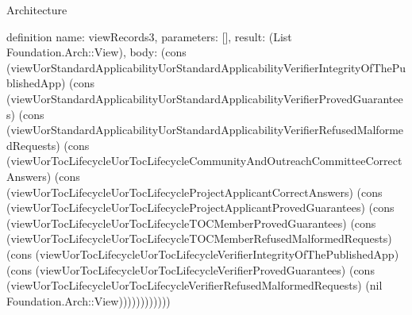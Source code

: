 \begin{lexlean}{Architecture}
\begin{semanticmodule}
definition{
  name: viewRecords3,
  parameters: [],
  result: (List Foundation.Arch::View),
  body: (cons (viewUorStandardApplicabilityUorStandardApplicabilityVerifierIntegrityOfThePublishedApp) (cons (viewUorStandardApplicabilityUorStandardApplicabilityVerifierProvedGuarantees) (cons (viewUorStandardApplicabilityUorStandardApplicabilityVerifierRefusedMalformedRequests) (cons (viewUorTocLifecycleUorTocLifecycleCommunityAndOutreachCommitteeCorrectAnswers) (cons (viewUorTocLifecycleUorTocLifecycleProjectApplicantCorrectAnswers) (cons (viewUorTocLifecycleUorTocLifecycleProjectApplicantProvedGuarantees) (cons (viewUorTocLifecycleUorTocLifecycleTOCMemberProvedGuarantees) (cons (viewUorTocLifecycleUorTocLifecycleTOCMemberRefusedMalformedRequests) (cons (viewUorTocLifecycleUorTocLifecycleVerifierIntegrityOfThePublishedApp) (cons (viewUorTocLifecycleUorTocLifecycleVerifierProvedGuarantees) (cons (viewUorTocLifecycleUorTocLifecycleVerifierRefusedMalformedRequests) (nil Foundation.Arch::View))))))))))))
}


\end{semanticmodule}
\end{lexlean}
